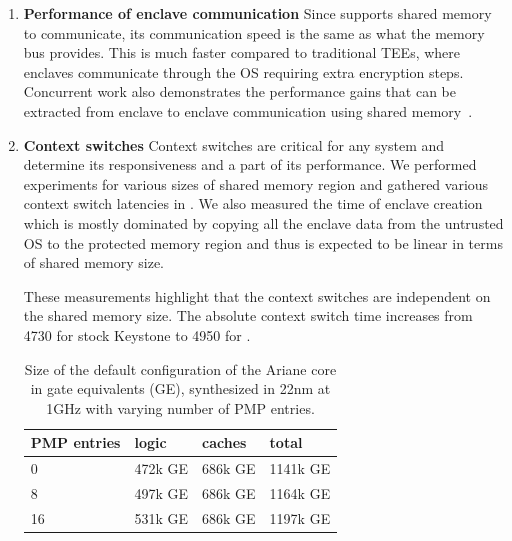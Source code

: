 \begin{enumerate}
\item \textbf{Performance of enclave communication}
Since \name{} supports shared memory to communicate, its communication speed is the same as what the memory bus provides. This is much faster compared to traditional TEEs, where enclaves communicate through the OS requiring extra encryption steps. Concurrent work also demonstrates the performance gains that can be extracted from enclave to enclave communication using shared memory~\cite{yu2020elasticlave}.


\item \textbf{Context switches}
Context switches are critical for any system and determine its responsiveness and a part of its performance.
We performed experiments for various sizes of shared memory region and gathered various context switch latencies in . We also measured the time of enclave creation which is mostly dominated by copying all the enclave data from the untrusted OS to the protected memory region and thus is expected to be linear in terms of shared memory size. 

These measurements highlight that the context switches are independent on the shared memory size. The absolute context switch time increases from 4730 for stock Keystone to 4950 for \name{}.

\begin{table}[tbp]
    \centering
    \caption{Size of the default configuration of the Ariane core in gate equivalents (GE), synthesized in 22nm at 1GHz with varying number of PMP entries.}
    \begin{tabular}{llll}\toprule
        PMP entries & logic & caches & total \\\midrule
        0 & 472k GE & 686k GE & 1141k GE \\
        8 & 497k GE & 686k GE & 1164k GE \\
        16 & 531k GE & 686k GE & 1197k GE \\ \bottomrule
    \end{tabular}
    

\end{table}
\end{enumerate}
